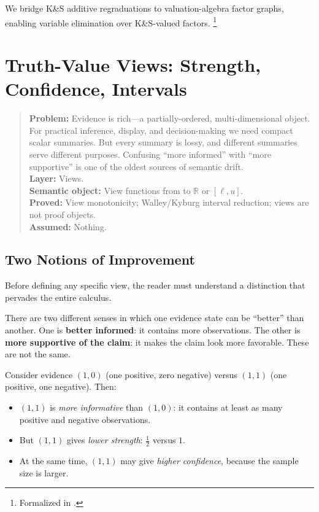 \documentclass[11pt,openany]{report}
\begin{document}
We bridge K\&S additive regraduations to valuation-algebra factor graphs,
enabling variable elimination over K\&S-valued factors.%
\footnote{Formalized in .}


\chapter{Truth-Value Views: Strength, Confidence, Intervals}
\label{ch:tv-views}

\begin{quote}\small
\textbf{Problem:} Evidence is rich---a partially-ordered, multi-dimensional
object.  For practical inference, display, and decision-making we need
compact scalar summaries.  But every summary is lossy, and different
summaries serve different purposes.  Confusing ``more informed'' with
``more supportive'' is one of the oldest sources of semantic drift.\\[4pt]
\textbf{Layer:} Views.\\
\textbf{Semantic object:} View functions from \Evidence{} to $\mathbb{R}$ or $[\ell, u]$.\\
\textbf{Proved:} View monotonicity; Walley/Kyburg interval reduction; views are not proof objects.\\
\textbf{Assumed:} Nothing.
\end{quote}

\section{Two Notions of Improvement}
\label{sec:two-notions}

Before defining any specific view, the reader must understand a
distinction that pervades the entire calculus.

There are two different senses in which one evidence state can be
``better'' than another.  One is \textbf{better informed}: it contains
more observations.  The other is \textbf{more supportive of the claim}:
it makes the claim look more favorable.  These are not the same.

Consider evidence $(1, 0)$ (one positive, zero negative) versus
$(1, 1)$ (one positive, one negative).  Then:
\begin{itemize}
\item $(1, 1)$ is \emph{more informative} than $(1, 0)$: it contains at
  least as many positive and negative observations.
\item But $(1, 1)$ gives \emph{lower strength}: $\frac{1}{2}$ versus $1$.
\item At the same time, $(1, 1)$ may give \emph{higher confidence},
  because the sample size is larger.
\end{itemize}
\end{document}
